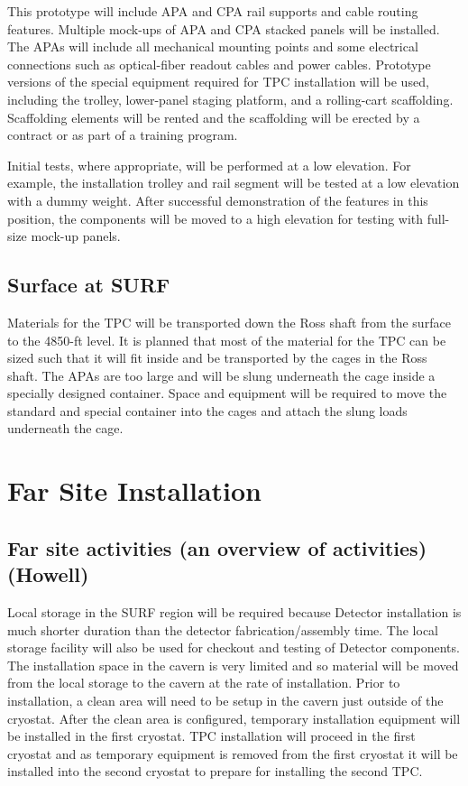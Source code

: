 This prototype will include APA and CPA rail supports and cable routing features. Multiple mock-ups of APA and CPA stacked panels will be installed. The APAs will include all mechanical mounting points and 
some electrical connections such as optical-fiber readout cables and power cables. Prototype versions of the special equipment required for TPC installation will be used, including the trolley, lower-panel 
staging platform, and a rolling-cart scaffolding. Scaffolding elements will be rented and the scaffolding will be erected by a contract or as part of a training program. 

Initial tests, where appropriate, will be performed at a low elevation. For example, the installation trolley 
and rail segment will be tested at a low elevation with a dummy weight. After successful demonstration of the features in this position, the components will be moved to a high elevation for testing with full-
size mock-up panels. 

\subsection{Surface at SURF}
\label{fd:install:tempeqp:surfsurface}

Materials for the TPC will be transported down the Ross shaft from the surface to the 4850-ft level.  It is planned that most of the material for the TPC can be sized such that it will fit inside and be transported by the cages in the Ross shaft.  The APAs are too large and will be slung underneath the cage inside a specially designed container.  Space and equipment will be required to move the standard and special container into the cages and attach the slung loads underneath the cage.  

\section{Far Site Installation}
\label{fd:install:fsinstall}

\subsection{Far site activities (an overview of activities) (Howell)}
\label{fd:install:fsactivities}

Local storage in the SURF region will be required because Detector installation is much shorter duration than the detector fabrication/assembly time. The local storage facility will also be used for checkout and 
testing of Detector components. The installation space in the cavern is very limited and so material will be moved from the local storage to the cavern at the rate of installation. Prior to installation, a clean area 
will need to be setup in the cavern just outside of the cryostat. After the clean area is configured, temporary installation equipment will be installed in the first cryostat. TPC installation will proceed in the 
first cryostat and as temporary equipment is removed from the first cryostat it will be installed into the second cryostat to prepare for installing the second TPC.

